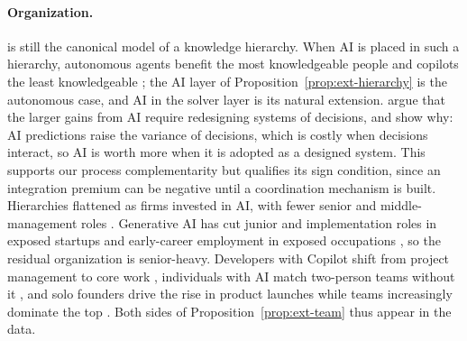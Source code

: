 \paragraph{Organization.} \citet{garicano2000hierarchies} is still the canonical model of a knowledge hierarchy. When AI is placed in such a hierarchy, autonomous agents benefit the most knowledgeable people and copilots the least knowledgeable \citep{ide2025artificial}; the AI layer of Proposition~\ref{prop:ext-hierarchy} is the autonomous case, and AI in the solver layer is its natural extension. \citet{agrawal2022power} argue that the larger gains from AI require redesigning systems of decisions, and \citet{agrawal2024artificial} show why: AI predictions raise the variance of decisions, which is costly when decisions interact, so AI is worth more when it is adopted as a designed system. This supports our process complementarity but qualifies its sign condition, since an integration premium can be negative until a coordination mechanism is built. Hierarchies flattened as firms invested in AI, with fewer senior and middle-management roles \citep{babina2025firm}. Generative AI has cut junior and implementation roles in exposed startups \citep{gupta2026generative} and early-career employment in exposed occupations \citep{brynjolfsson2025canaries}, so the residual organization is senior-heavy. Developers with Copilot shift from project management to core work \citep{hoffmann2024generative}, individuals with AI match two-person teams without it \citep{dellacqua2026cybernetic}, and solo founders drive the rise in product launches while teams increasingly dominate the top \citep{kim2026generative}. Both sides of Proposition~\ref{prop:ext-team} thus appear in the data.

